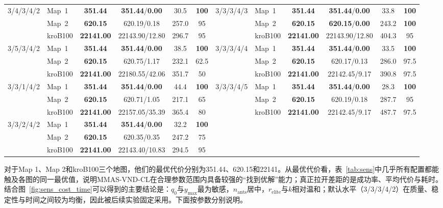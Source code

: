 \documentclass[lettersize,journal]{IEEEtran}
\begin{document}
\begin{table}[!t]
{\begin{tabular}{llcccc|llcccc}
\multirow{3}{*}{3/4/3/4/2} & Map~1 & \textbf{351.44} & \textbf{351.44}/\textbf{0.00} & 30.5 & \textbf{100} & \multirow{3}{*}{3/3/3/4/3} & Map~1 & \textbf{351.44} & \textbf{351.44}/\textbf{0.00} & 33.8 & \textbf{100} \\
& Map~2 & \textbf{620.15} & 620.19/0.18 & 257.0 & 95 & & Map~2 & \textbf{620.15} & \textbf{620.15}/\textbf{0.00} & 243.2 & \textbf{100} \\
& kroB100 & \textbf{22141.00} & 22143.90/12.80 & 296.7 & 95 & & kroB100 & \textbf{22141.00} & 22143.90/12.80 & 404.3 & 95 \\ \cline{2-6}\cline{8-12}
\multirow{3}{*}{3/5/3/4/2} & Map~1 & \textbf{351.44} & \textbf{351.44}/\textbf{0.00} & 38.5 & \textbf{100} & \multirow{3}{*}{3/3/3/4/4} & Map~1 & \textbf{351.44} & \textbf{351.44}/\textbf{0.00} & 33.5 & \textbf{100} \\
& Map~2 & \textbf{620.15} & 620.75/1.17 & 232.1 & 62.5 & & Map~2 & \textbf{620.15} & 620.17/0.13 & 286.0 & 97.5 \\
& kroB100 & \textbf{22141.00} & 22180.55/42.06 & 351.7 & 50 & & kroB100 & \textbf{22141.00} & 22142.45/9.17 & 390.8 & 97.5 \\ \cline{2-6}\cline{8-12}
\multirow{3}{*}{3/3/1/4/2} & Map~1 & \textbf{351.44} & \textbf{351.44}/\textbf{0.00} & 44.4 & \textbf{100} & \multirow{3}{*}{3/3/3/4/5} & Map~1 & \textbf{351.44} & \textbf{351.44}/\textbf{0.00} & 28.3 & \textbf{100} \\
& Map~2 & \textbf{620.15} & 620.71/1.05 & 217.1 & 65 & & Map~2 & \textbf{620.15} & 620.19/0.18 & 287.7 & 95 \\
& kroB100 & \textbf{22141.00} & 22157.05/35.39 & 365.4 & 80 & & kroB100 & \textbf{22141.00} & 22142.45/9.17 & 487.7 & 97.5 \\ \cline{2-6}\cline{8-12}
\multirow{3}{*}{3/3/2/4/2} & Map~1 & \textbf{351.44} & \textbf{351.44}/\textbf{0.00} & 32.2 & \textbf{100} & & & & & & \\
& Map~2 & \textbf{620.15} & 620.35/0.35 & 247.2 & 75 & & & & & & \\
& kroB100 & \textbf{22141.00} & 22143.40/10.83 & 294.5 & 95 & & & & & & \\
\bottomrule
\end{tabular}
}
\end{table}

对于Map 1、Map 2和kroB100三个地图，他们的最优代价分别为351.44、620.15和22141。从最优代价看，表~\textcolor{blue}{\ref{tab:sens}}中几乎所有配置都能触及各图的同一最优值，说明MMAS-VND-CL在合理参数范围内具备较强的“找到优解”能力；真正拉开差距的是成功率、平均代价与耗时。结合图~\textcolor{blue}{\ref{fig:sens_cost_time}}可以得到的主要结论是：$q_0$与$y_{\max}$最为敏感，$n_{\mathrm{ants}}$居中，$r_{\mathrm{elite}}$与$k$相对温和；默认水平（3/3/3/4/2）在质量、稳定性与时间之间较为均衡，因此被后续实验固定采用。下面按参数分别说明。
\end{document}
